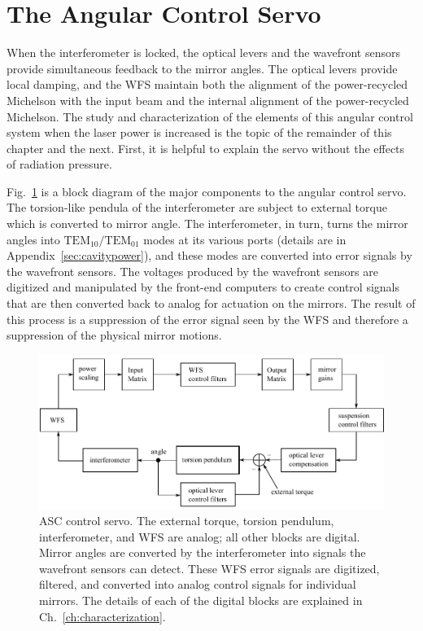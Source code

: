\section{The Angular Control Servo}
When the interferometer is locked, the optical levers and the wavefront sensors provide simultaneous feedback to the mirror angles. The optical levers provide local damping, and the WFS maintain both the alignment of the power-recycled Michelson with the input beam and the internal alignment of the power-recycled Michelson. The study and characterization of the elements of this angular control system when the laser power is increased is the topic of the remainder of this chapter and the next. First, it is helpful to explain the servo without the effects of radiation pressure.

Fig.~\ref{fig:ASCcontrolservo} is a block diagram of the major components to the angular control servo. The torsion-like pendula of the interferometer are subject to external torque which is converted to mirror angle. The interferometer, in turn, turns the mirror angles into $\mathrm{TEM}_{10}/\mathrm{TEM}_{01}$ modes at its various ports (details are in Appendix~\ref{sec:cavitypower}), and these modes are converted into error signals by the wavefront sensors. The voltages produced by the wavefront sensors are digitized and manipulated by the front-end computers to create control signals that are then converted back to analog for actuation on the mirrors. The result of this process is a suppression of the error signal seen by the WFS and therefore a suppression of the physical mirror motions. 

\begin{figure} \begin{centering} 
\includegraphics{figures/ASCcontrolservo.pdf} 
\caption[ASC control servo]{ASC control servo. The external torque, torsion pendulum, interferometer, and WFS are analog; all other blocks are digital. Mirror angles are converted by the interferometer into signals the wavefront sensors can detect. These WFS error signals are digitized, filtered, and converted into analog control signals for individual mirrors. The details of each of the digital blocks are explained in Ch.~\ref{ch:characterization}.}
\label{fig:ASCcontrolservo}
\end{centering}
\end{figure}


